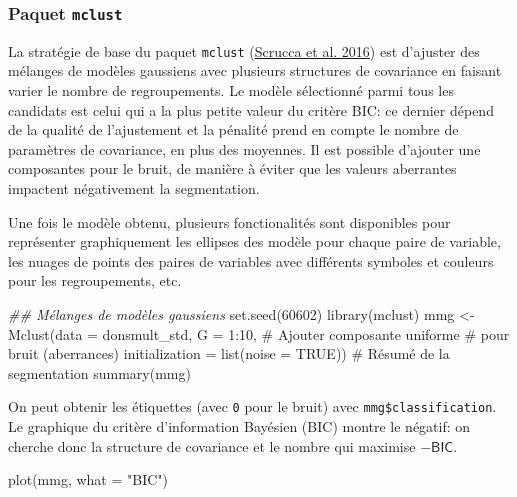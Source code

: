 \documentclass[
  11pt,
  letterpaper,
]{scrbook}
\newenvironment{Shaded}{\begin{snugshade}}{\end{snugshade}}
\newcommand{\AttributeTok}[1]{\textcolor[rgb]{0.40,0.45,0.13}{#1}}
\newcommand{\CommentTok}[1]{\textcolor[rgb]{0.37,0.37,0.37}{#1}}
\newcommand{\ConstantTok}[1]{\textcolor[rgb]{0.56,0.35,0.01}{#1}}
\newcommand{\DecValTok}[1]{\textcolor[rgb]{0.68,0.00,0.00}{#1}}
\newcommand{\DocumentationTok}[1]{\textcolor[rgb]{0.37,0.37,0.37}{\textit{#1}}}
\newcommand{\FunctionTok}[1]{\textcolor[rgb]{0.28,0.35,0.67}{#1}}
\newcommand{\NormalTok}[1]{\textcolor[rgb]{0.00,0.23,0.31}{#1}}
\newcommand{\OtherTok}[1]{\textcolor[rgb]{0.00,0.23,0.31}{#1}}
\newcommand{\SpecialCharTok}[1]{\textcolor[rgb]{0.37,0.37,0.37}{#1}}
\newcommand{\StringTok}[1]{\textcolor[rgb]{0.13,0.47,0.30}{#1}}
\theoremstyle{definition}
\theoremstyle{remark}
\begin{document}
\hypertarget{paquet-mclust}{%
\subsubsection{\texorpdfstring{Paquet
\texttt{mclust}}{Paquet mclust}}\label{paquet-mclust}}

La stratégie de base du paquet \texttt{mclust}
(\protect\hyperlink{ref-mclust5}{Scrucca et al. 2016}) est d'ajuster des
mélanges de modèles gaussiens avec plusieurs structures de covariance en
faisant varier le nombre de regroupements. Le modèle sélectionné parmi
tous les candidats est celui qui a la plus petite valeur du critère BIC:
ce dernier dépend de la qualité de l'ajustement et la pénalité prend en
compte le nombre de paramètres de covariance, en plus des moyennes. Il
est possible d'ajouter une composantes pour le bruit, de manière à
éviter que les valeurs aberrantes impactent négativement la
segmentation.

Une fois le modèle obtenu, plusieurs fonctionalités sont disponibles
pour représenter graphiquement les ellipses des modèle pour chaque paire
de variable, les nuages de points des paires de variables avec
différents symboles et couleurs pour les regroupements, etc.

\begin{Shaded}
\begin{Highlighting}[]
\DocumentationTok{\#\# Mélanges de modèles gaussiens}
\FunctionTok{set.seed}\NormalTok{(}\DecValTok{60602}\NormalTok{)}
\FunctionTok{library}\NormalTok{(mclust)}
\NormalTok{mmg }\OtherTok{\textless{}{-}} \FunctionTok{Mclust}\NormalTok{(}\AttributeTok{data =}\NormalTok{ donsmult\_std,}
       \AttributeTok{G =} \DecValTok{1}\SpecialCharTok{:}\DecValTok{10}\NormalTok{,}
       \CommentTok{\# Ajouter composante uniforme}
       \CommentTok{\#  pour bruit (aberrances)}
       \AttributeTok{initialization =} \FunctionTok{list}\NormalTok{(}\AttributeTok{noise =} \ConstantTok{TRUE}\NormalTok{))}
\CommentTok{\# Résumé de la segmentation}
\FunctionTok{summary}\NormalTok{(mmg)}
\end{Highlighting}
\end{Shaded}

On peut obtenir les étiquettes (avec \texttt{0} pour le bruit) avec
\texttt{mmg\$classification}. Le graphique du critère d'information
Bayésien (BIC) montre le négatif: on cherche donc la structure de
covariance et le nombre qui maximise \(-\mathsf{BIC}\).

\begin{Shaded}
\begin{Highlighting}[]
\FunctionTok{plot}\NormalTok{(mmg, }\AttributeTok{what =} \StringTok{"BIC"}\NormalTok{)}
\end{Highlighting}
\end{Shaded}
\end{document}
